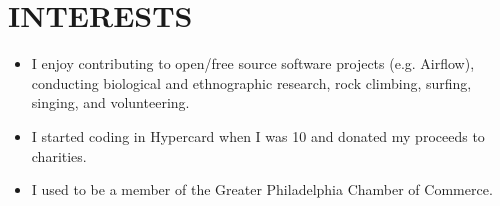 \documentclass[a4paper, 12pt]{article}
\begin{document}
\section*{INTERESTS}
\vspace{-3mm}
\begin{itemize}[leftmargin=5mm] 
\itemsep -2pt
	\item I enjoy contributing to open/free source software projects (e.g. Airflow), conducting biological and ethnographic research, rock climbing, surfing, singing, and volunteering.
	\item I started coding in Hypercard when I was 10 and donated my proceeds to charities.
	\item I used to be a member of the Greater Philadelphia Chamber of Commerce.
\end{itemize}

                
\end{document}
